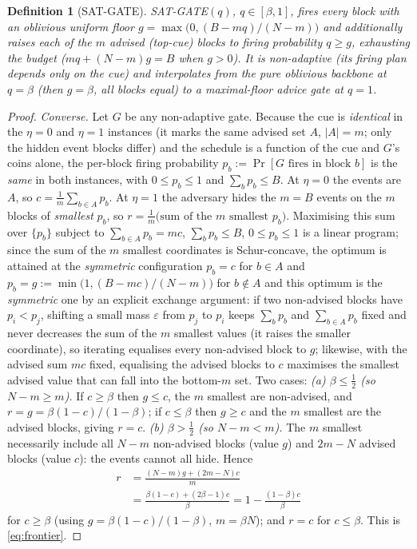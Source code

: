 ﻿\documentclass[lettersize,journal]{IEEEtran}
\newtheorem*{defn}{Definition}
\begin{document}
\begin{defn}[\textsc{SAT-GATE}]\label{def:sat}
\textsc{SAT-GATE}$(q)$, $q\in[\beta,1]$, fires every block with an oblivious uniform floor $g=\max\!\big(0,(B-mq)/(N-m)\big)$ and additionally raises each of the $m$ advised (top-cue) blocks to firing probability $q\ge g$, exhausting the budget ($mq+(N-m)g=B$ when $g>0$). It is non-adaptive (its firing plan depends only on the cue) and interpolates from the pure oblivious backbone at $q=\beta$ (then $g=\beta$, all blocks equal) to a maximal-floor advice gate at $q=1$.
\end{defn}

\begin{proof}
\emph{Converse.} Let $G$ be any non-adaptive gate. Because the cue is \emph{identical} in the $\eta{=}0$ and $\eta{=}1$ instances (it marks the same advised set $A$, $|A|=m$; only the hidden event blocks differ) and the schedule is a function of the cue and $G$'s coins alone, the per-block firing probability $p_b:=\Pr[G\text{ fires in block }b]$ is the \emph{same} in both instances, with $0\le p_b\le1$ and $\sum_b p_b\le B$. At $\eta{=}0$ the events are $A$, so $c=\tfrac1m\sum_{b\in A}p_b$. At $\eta{=}1$ the adversary hides the $m=B$ events on the $m$ blocks of \emph{smallest} $p_b$, so $r=\tfrac1m\big(\text{sum of the }m\text{ smallest }p_b\big)$. Maximising this sum over $\{p_b\}$ subject to $\sum_{b\in A}p_b=mc$, $\sum_b p_b\le B$, $0\le p_b\le1$ is a linear program; since the sum of the $m$ smallest coordinates is Schur-concave, the optimum is attained at the \emph{symmetric} configuration $p_b=c$ for $b\in A$ and $p_b=g:=\min\!\big(1,(B-mc)/(N-m)\big)$ for $b\notin A$ and this optimum is the \emph{symmetric} one by an explicit exchange argument: if two non-advised blocks have $p_i<p_j$, shifting a small mass $\varepsilon$ from $p_j$ to $p_i$ keeps $\sum_b p_b$ and $\sum_{b\in A}p_b$ fixed and never decreases the sum of the $m$ smallest values (it raises the smaller coordinate), so iterating equalises every non-advised block to $g$; likewise, with the advised sum $mc$ fixed, equalising the advised blocks to $c$ maximises the smallest advised value that can fall into the bottom-$m$ set. Two cases:
\emph{(a) $\beta\le\tfrac12$ (so $N-m\ge m$).} If $c\ge\beta$ then $g\le c$, the $m$ smallest are non-advised, and $r=g=\beta(1-c)/(1-\beta)$; if $c\le\beta$ then $g\ge c$ and the $m$ smallest are the advised blocks, giving $r=c$.
\emph{(b) $\beta>\tfrac12$ (so $N-m<m$).} The $m$ smallest necessarily include all $N-m$ non-advised blocks (value $g$) and $2m-N$ advised blocks (value $c$): the events cannot all hide. Hence
\[
\begin{aligned}
r&=\frac{(N-m)g+(2m-N)c}{m}\\
&=\frac{\beta(1-c)+(2\beta-1)c}{\beta}=1-\frac{(1-\beta)c}{\beta}
\end{aligned}
\]
for $c\ge\beta$ (using $g=\beta(1-c)/(1-\beta)$, $m=\beta N$); and $r=c$ for $c\le\beta$. This is \eqref{eq:frontier}.


\end{proof}
\end{document}
